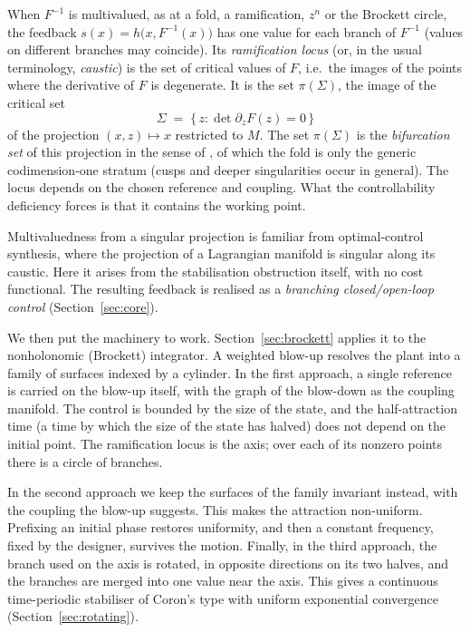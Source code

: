 \documentclass[11pt,reqno]{amsart}
\theoremstyle{plain}
\theoremstyle{definition}
\theoremstyle{remark}
\newcommand{\Sig}{\Sigma}
\begin{document}
When $F^{-1}$ is multivalued, as at a fold, a ramification, $z^n$ or the Brockett circle, the feedback
$s(x)=h\bigl(x,F^{-1}(x)\bigr)$ has one value for each branch of $F^{-1}$ (values on different branches may
coincide). Its
\emph{ramification locus} (or, in the usual terminology, \emph{caustic}) is the set of critical values of $F$, i.e.\ the images of the points where the derivative of $F$ is degenerate. It is the set $\pi(\Sig)$, the image of the
critical set
\[
  \Sig \;=\; \{\, z : \det \partial_z F(z) = 0 \,\}
\]
of the projection $(x,z)\mapsto x$ restricted to $M$. The set $\pi(\Sig)$ is the \emph{bifurcation set} of this projection
in the sense of \cite{AGV}, of which the fold is only the generic
codimension-one stratum (cusps and deeper singularities occur in general). The locus
depends on the chosen reference and coupling. What the controllability deficiency forces is that
it contains the working point.

Multivaluedness from a singular projection is familiar from optimal-control
synthesis, where the projection of a Lagrangian manifold is singular along its caustic. Here it
arises from the stabilisation obstruction itself, with no cost functional. The resulting feedback is realised
as a \emph{branching closed/open-loop control} (Section~\ref{sec:core}).

We then put the machinery to work. Section~\ref{sec:brockett} applies it to the
nonholonomic (Brockett) integrator. A weighted blow-up resolves the plant into a
family of surfaces indexed by a cylinder. In the first approach, a single reference is carried on the
blow-up itself, with the graph of the blow-down as the coupling manifold. The control is bounded by the
size of the state, and the half-attraction time (a time by which the size of the
state has halved) does not depend on the initial point. The ramification locus is the axis; over each of its nonzero points there is a circle of branches.

In the second approach we keep the surfaces of the family invariant instead, with the coupling the
blow-up suggests. This makes the attraction non-uniform. Prefixing an initial phase restores uniformity,
and then a constant frequency, fixed by the designer, survives the motion. Finally, in the third approach, the branch
used on the axis is rotated, in opposite directions on its two halves, and the branches are merged into one value near the axis. This gives a
continuous time-periodic stabiliser of Coron's type with uniform exponential convergence
(Section~\ref{sec:rotating}).
\end{document}
